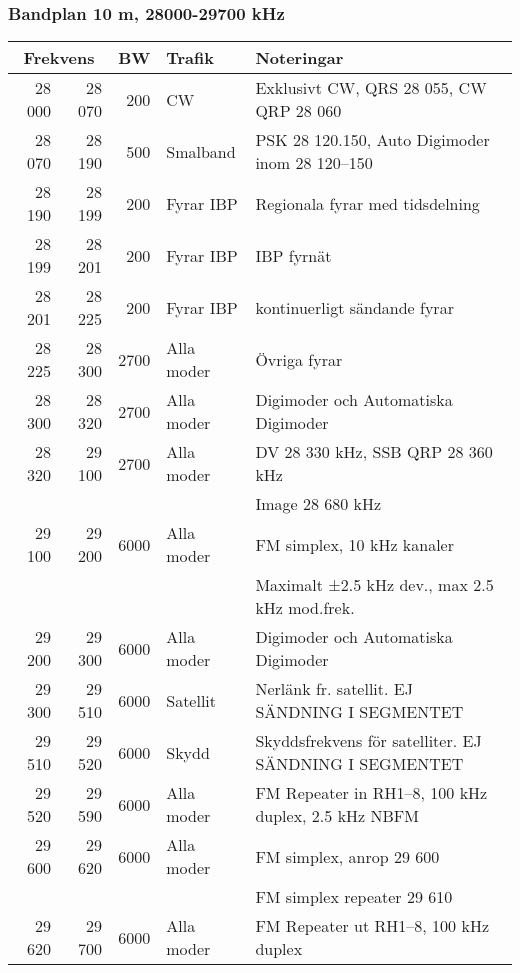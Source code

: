 \begin{landscape}
\subsubsection{Bandplan 10 m, 28000-29700 kHz}
\begin{tabular}{rrrll}
\multicolumn{2}{c}{\textbf{Frekvens}} & \textbf{BW} & \textbf{Trafik} & \textbf{Noteringar} \\ \hline
28 000 & 28 070 & 200  & CW         & Exklusivt CW, QRS 28 055, CW QRP 28 060                \\ \hline
28 070 & 28 190 & 500  & Smalband   & PSK 28 120.150, Auto Digimoder inom 28 120--150        \\ \hline
28 190 & 28 199 & 200  & Fyrar IBP  & Regionala fyrar med tidsdelning                        \\ \hline
28 199 & 28 201 & 200  & Fyrar IBP  & IBP fyrnät                                             \\ \hline
28 201 & 28 225 & 200  & Fyrar IBP  & kontinuerligt sändande fyrar                           \\ \hline
28 225 & 28 300 & 2700 & Alla moder & Övriga fyrar                                           \\ \hline
28 300 & 28 320 & 2700 & Alla moder & Digimoder och Automatiska Digimoder                    \\ \hline
28 320 & 29 100 & 2700 & Alla moder & DV 28 330 kHz, SSB QRP 28 360 kHz                      \\
       &        &      &            & Image 28 680 kHz                                       \\ \hline
29 100 & 29 200 & 6000 & Alla moder & FM simplex, 10 kHz kanaler                             \\
       &        &      &            & Maximalt ±2.5 kHz dev., max 2.5 kHz mod.frek.          \\ \hline
29 200 & 29 300 & 6000 & Alla moder & Digimoder och Automatiska Digimoder                    \\ \hline
29 300 & 29 510 & 6000 & Satellit   & Nerlänk fr. satellit. EJ SÄNDNING I SEGMENTET          \\ \hline
29 510 & 29 520 & 6000 & Skydd      & Skyddsfrekvens för satelliter. EJ SÄNDNING I SEGMENTET \\ \hline
29 520 & 29 590 & 6000 & Alla moder & FM Repeater in RH1--8, 100 kHz duplex, 2.5 kHz NBFM    \\ \hline
29 600 & 29 620 & 6000 & Alla moder & FM simplex, anrop 29 600                               \\
       &        &      &            & FM simplex repeater 29 610                             \\ \hline
29 620 & 29 700 & 6000 & Alla moder & FM Repeater ut RH1--8, 100 kHz duplex                  \\ \hline
\end{tabular}


\end{landscape}
